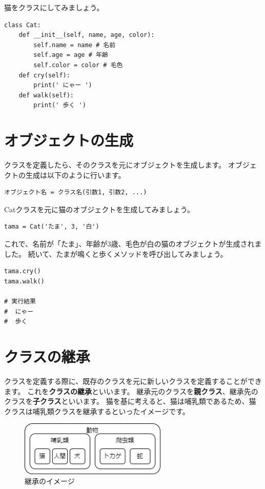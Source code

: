 \documentclass[a4paper,titlepage,dvipdfmx]{jarticle}
\begin{document}
猫をクラスにしてみましょう。
\begin{lstlisting}[caption=Catクラスの定義,label=cat]
class Cat:
    def __init__(self, name, age, color):
        self.name = name # 名前
        self.age = age # 年齢
        self.color = color # 毛色
    def cry(self):
        print(' にゃー ')
    def walk(self):
        print(' 歩く ')
\end{lstlisting}

\section{オブジェクトの生成}
クラスを定義したら、そのクラスを元にオブジェクトを生成します。
オブジェクトの生成は以下のように行います。
\begin{lstlisting}[caption=オブジェクトの生成,label=object]
オブジェクト名 = クラス名(引数1, 引数2, ...)
\end{lstlisting}

Catクラスを元に猫のオブジェクトを生成してみましょう。
\begin{lstlisting}[caption=Catクラスのインスタンス化,label=cat_instance]
tama = Cat('たま', 3, '白')
\end{lstlisting}

これで、名前が「たま」、年齢が3歳、毛色が白の猫のオブジェクトが生成されました。
続いて、たまが鳴くと歩くメソッドを呼び出してみましょう。

\begin{lstlisting}[caption=Catクラスのメソッド呼び出し,label=cat_method]
tama.cry()
tama.walk()

# 実行結果
#  にゃー
#  歩く
\end{lstlisting}

\section{クラスの継承}
クラスを定義する際に、既存のクラスを元に新しいクラスを定義することができます。
これを\textbf{クラスの継承}といいます。
継承元のクラスを\textbf{親クラス}、継承先のクラスを\textbf{子クラス}といいます。
猫を基に考えると、猫は哺乳類であるため、猫クラスは哺乳類クラスを継承するといったイメージです。

\begin{figure}[H]
  \centering
  \includegraphics[width=7cm]{./override.png}
  \caption{継承のイメージ}
  \label{inheritance}
\end{figure}
\end{document}
